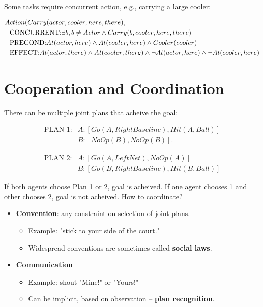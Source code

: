\documentclass[11pt]{article}
\begin{document}
Some tasks require concurrent action, e.g., carrying a large cooler:

\vspace{-.25in}
\begin{align*}
& Action(Carry(actor, cooler, here, there),\\
& \hspace{.1in} \text{CONCURRENT:} \exists b, b \neq Actor \land Carry(b, cooler, here, there) \\
& \hspace{.1in} \text{PRECOND:} At(actor, here) \land At(cooler, here) \land Cooler(cooler) \\
& \hspace{.1in} \text{EFFECT:} At(actor, there) \land At(cooler, there) \land \neg At(actor, here) \land \neg At(cooler, here)
\end{align*}
\vspace{-.25in}
\section{Cooperation and Coordination}
\label{sec:org0f8fe01}

There can be multiple joint plans that acheive the goal:




\begin{align*}
\text{PLAN 1}: &A : [Go(A,RightBaseline),Hit(A,Ball)] \\
               &B : [NoOp(B),NoOp(B)].
\end{align*}




\begin{align*}
\text{PLAN 2}: &A : [Go(A,LeftNet),NoOp(A)] \\
               &B : [Go(B, RightBaseline), Hit(B, Ball)]
\end{align*}




If both agents choose Plan 1 or 2, goal is acheived.  If one agent chooses 1 and other chooses 2, goal is not acheived.  How to coordinate?

\begin{itemize}
\item \textbf{Convention}: any constraint on selection of joint plans.

\begin{itemize}
\item Example: "stick to your side of the court."
\item Widespread conventions are sometimes called \textbf{social laws}.
\end{itemize}

\item \textbf{Communication}

\begin{itemize}
\item Example: shout "Mine!" or "Yours!"
\item Can be implicit, based on observation -- \textbf{plan recognition}.
\end{itemize}
\end{itemize}
\end{document}
